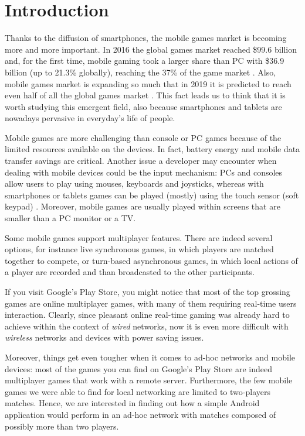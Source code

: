 \section{Introduction}
Thanks to the diffusion of smartphones, the mobile games market is becoming
more and more important. In 2016 the global games market reached \$99.6
billion and, for the first time, mobile gaming took a larger share than PC
with \$36.9 billion (up to 21.3\% globally), reaching the 37\% of the game
market \cite{bib:newzoo2}. Also, mobile games market is expanding so much that
in 2019 it is predicted to reach even half of all the global games market
\cite{bib:newzoo}. This fact leads us to think that it is worth studying
this emergent field, also because smartphones and tablets are nowadays
pervasive in everyday's life of people.

Mobile games are more challenging than console or PC games because of the
limited resources available on the devices. In fact, battery energy and
mobile data transfer savings are critical. Another issue a developer may
encounter when dealing with mobile devices could be the input mechanism:
PCs and consoles allow users to play using mouses, keyboards and joysticks,
whereas with smartphones or tablets games can be played (mostly) using the
touch sensor (soft keypad) \cite{bib:mobile-input-devices}. Moreover, mobile
games are usually played within screens that are smaller than a PC monitor or a
TV.

Some mobile games support multiplayer features. There are indeed several
options, for instance live synchronous games, in which players are matched
together to compete, or turn-based asynchronous games, in which local actions
of a player are recorded and than broadcasted to the other participants.

If you visit Google's Play Store, you might notice that most of the top
grossing games are online multiplayer games, with many of them requiring
real-time users interaction. Clearly, since pleasant online real-time gaming
was already hard to achieve within the context of \textit{wired} networks, now
it is even more difficult with \textit{wireless} networks and devices with
power saving issues.

Moreover, things get even tougher when it comes to ad-hoc networks and mobile
devices: most of the games you can find on Google's Play Store are indeed
multiplayer games that work with a remote server. Furthermore, the few mobile
games we were able to find for local networking are limited to two-players
matches. Hence, we are interested in finding out how a simple Android
application would perform in an ad-hoc network with matches composed of
possibly more than two players.

